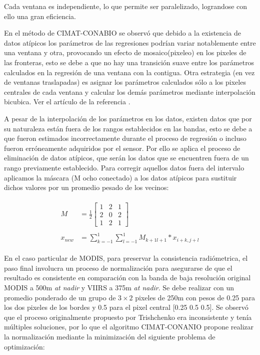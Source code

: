 Cada ventana es independiente, lo que permite ser paralelizado, lograndose con ello una gran eficiencia. 

En el método de CIMAT-CONABIO se observó que debido a la existencia de datos atípicos los parámetros de las regresiones podrían variar notablemente entre una ventana y otra, provocando un efecto de mosaico(pixeleo) en los pixeles de las fronteras, esto se debe a que no hay una transición suave entre los parámetros calculados en la regresión de una ventana con la contigua. Otra estrategia (en vez de ventanas traslapadas) es asignar los parámetros calculados sólo a los pixeles centrales de cada ventana y calcular los demás parámetros mediante interpolación bicubica. Ver el artículo de la referencia \cite{Judith}.

A pesar de la interpolación de los parámetros en los datos, existen datos que por su naturaleza están fuera de los rangos establecidos en las bandas, esto se debe a que fueron estimados incorrectamente durante el proceso de regresión o incluso fueron erróneamente adquiridos por el sensor. Por ello se aplica el  proceso de eliminación de datos atípicos, que serán los datos que se encuentren fuera de un rango previamente establecido. Para corregir aquellos datos fuera del intervalo aplicamos la máscara (M ocho conectado) a los datos atípicos para sustituir dichos valores por un promedio pesado de los vecinos: 

\begin{eqnarray}
\label{filtro}
\begin{aligned}
M  & = \frac{1}{2} \begin{bmatrix}
1 & 2 & 1\\
2 & 0 & 2\\
1 & 2 & 1
\end{bmatrix}\\ \\ \nonumber
x_{new} & = \sum_{k=-1}^{1}\sum_{l=-1}^{1}M_{k+1l+1} * x_{i+k, j+l}
\end{aligned}
\end{eqnarray}

En el caso particular de MODIS, para preservar la consistencia  radiómetrica, el paso final involucra un proceso de normalización para asegurarse de que el resultado es consistente en comparación con la banda de baja resolución original MODIS a 500m \textit{at nadir} y VIIRS a 375m \textit{at nadir}. Se debe realizar con un promedio ponderado de un grupo de $3  \times 2$ pixeles de 250m con pesos de 0.25 para los dos pixeles de los bordes y 0.5 para el pixel central [0.25 0.5 0.5]. Se observó que el proceso originalmente propuesto por Trishchenko era inconsistente y tenía múltiples soluciones, por lo que el algoritmo CIMAT-CONANIO propone realizar la normalización mediante la minimización del siguiente problema de optimización: 

